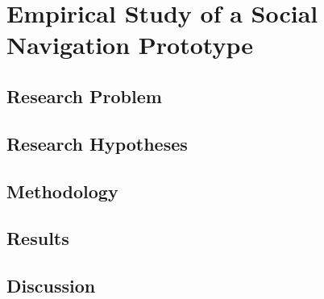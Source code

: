 \chapter{Empirical Study of a Social Navigation Prototype}
\label{chapter:empirical}

\section{Research Problem}

\section{Research Hypotheses}

\section{Methodology}
\label{section:empirical.methodology}

\section{Results}

\section{Discussion}
